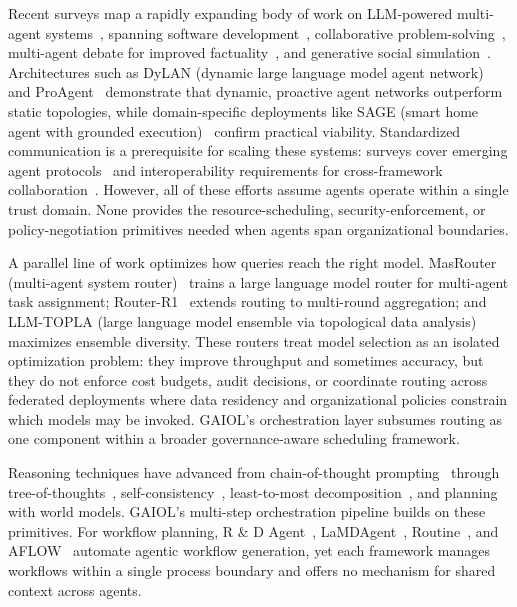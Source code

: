 \documentclass{iopjournal}
\begin{document}
Recent surveys map a rapidly expanding body of work on LLM-powered multi-agent systems~\cite{oh2015survey, dong2024large}, spanning software development~\cite{qian2024chatdev}, collaborative problem-solving~\cite{AgentVerse_EMNLP23}, multi-agent debate for improved factuality~\cite{Cooperation_NeurIPS23}, and generative social simulation~\cite{RolePlay_Nature23}. Architectures such as DyLAN (dynamic large language model agent network)~\cite{DyLAN_ICLR24} and ProAgent~\cite{ProAgent_AAAI24} demonstrate that dynamic, proactive agent networks outperform static topologies, while domain-specific deployments like SAGE (smart home agent with grounded execution)~\cite{SAGE_AAAI24} confirm practical viability. Standardized communication is a prerequisite for scaling these systems: surveys cover emerging agent protocols~\cite{AIAgentProtocols} and interoperability requirements for cross-framework collaboration~\cite{AgentInterop}. However, all of these efforts assume agents operate within a single trust domain. None provides the resource-scheduling, security-enforcement, or policy-negotiation primitives needed when agents span organizational boundaries.

A parallel line of work optimizes how queries reach the right model. MasRouter (multi-agent system router)~\cite{MasRouter} trains a large language model router for multi-agent task assignment; Router-R1~\cite{RouterR1} extends routing to multi-round aggregation; and LLM-TOPLA (large language model ensemble via topological data analysis)~\cite{LLMTOPLA} maximizes ensemble diversity. These routers treat model selection as an isolated optimization problem: they improve throughput and sometimes accuracy, but they do not enforce cost budgets, audit decisions, or coordinate routing across federated deployments where data residency and organizational policies constrain which models may be invoked. GAIOL's orchestration layer subsumes routing as one component within a broader governance-aware scheduling framework.

Reasoning techniques have advanced from chain-of-thought prompting~\cite{CoT_NeurIPS22} through tree-of-thoughts~\cite{Tree_NeurIPS23}, self-consistency~\cite{SelfConsistency_ICLR23}, least-to-most decomposition~\cite{Least2Most_EMNLP22}, and planning with world models. GAIOL's multi-step orchestration pipeline builds on these primitives. For workflow planning, R \& D Agent~\cite{RDAgent}, LaMDAgent~\cite{qian2024chatdev}, Routine~\cite{Routine}, and AFLOW~\cite{AFLOW} automate agentic workflow generation, yet each framework manages workflows within a single process boundary and offers no mechanism for shared context across agents.
\end{document}
